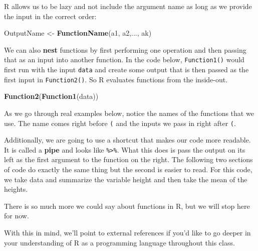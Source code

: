\documentclass[
]{book}
\newenvironment{Shaded}{\begin{snugshade}}{\end{snugshade}}
\newcommand{\KeywordTok}[1]{\textcolor[rgb]{0.13,0.29,0.53}{\textbf{#1}}}
\newcommand{\NormalTok}[1]{#1}
\newcommand{\OperatorTok}[1]{\textcolor[rgb]{0.81,0.36,0.00}{\textbf{#1}}}
\newcommand{\StringTok}[1]{\textcolor[rgb]{0.31,0.60,0.02}{#1}}
\begin{document}
R allows us to be lazy and not include the argument name as long as we provide the input in the correct order:

\begin{Shaded}
\begin{Highlighting}[]
\NormalTok{OutputName <-}\StringTok{ }\KeywordTok{FunctionName}\NormalTok{(a1, a2,..., ak)}
\end{Highlighting}
\end{Shaded}

We can also \textbf{nest} functions by first performing one operation and then passing that as an input into another function. In the code below, \texttt{Function1()} would first run with the input \texttt{data} and create some output that is then passed as the first input in \texttt{Function2()}. So R evaluates functions from the inside-out.

\begin{Shaded}
\begin{Highlighting}[]
\KeywordTok{Function2}\NormalTok{(}\KeywordTok{Function1}\NormalTok{(data))}
\end{Highlighting}
\end{Shaded}

As we go through real examples below, notice the names of the functions that we use. The name comes right before \texttt{(} and the inputs we pass in right after \texttt{(}.

Additionally, we are going to use a shortcut that makes our code more readable. It is called a \textbf{pipe} and looks like \texttt{\%\textgreater{}\%}. What this does is pass the output on its left as the first argument to the function on the right. The following two sections of code do exactly the same thing but the second is easier to read. For this code, we take data and summarize the variable height and then take the mean of the heights.

\begin{Shaded}
\end{Shaded}

There is so much more we could say about functions in R, but we will stop here for now.

With this in mind, we'll point to external references if you'd like to go deeper in your understanding of R as a programming language throughout this class.
\end{document}
